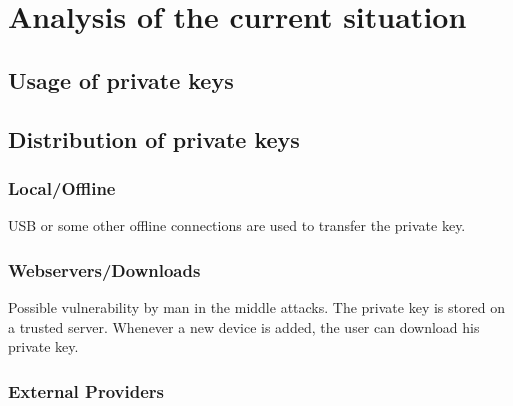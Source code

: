 \documentclass[12pt,twoside,a4paper,parskip]{scrbook}
\begin{document}


\chapter{Analysis of the current situation}

\section{Usage of private keys}

\section{Distribution of private keys}

\subsection{Local/Offline}

USB or some other offline connections are used to transfer the private key.



\subsection{Webservers/Downloads}

Possible vulnerability by man in the middle attacks.
The private key is stored on a trusted server. Whenever a new device is added, the user can download his private key.

\subsection{External Providers}
\end{document}
